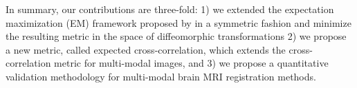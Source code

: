 In summary, our contributions are three-fold: 1) we extended the expectation maximization (EM) framework proposed by \cite{Arce-santana2014} in a symmetric fashion and minimize the resulting metric in the space of diffeomorphic transformations 2) we propose a new metric, called expected cross-correlation, which extends the cross-correlation metric for multi-modal images, and 3) we propose a quantitative validation methodology for multi-modal brain MRI registration methods.
